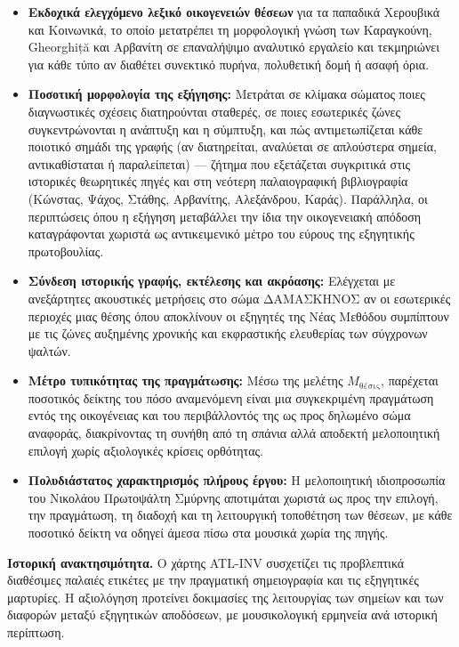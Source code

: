 \documentclass[11pt,a4paper]{article}
\begin{document}
\begin{itemize}
\item
  \textbf{Εκδοχικά ελεγχόμενο λεξικό οικογενειών θέσεων} για τα παπαδικά Χερουβικά και Κοινωνικά, το οποίο μετατρέπει τη μορφολογική γνώση των Καραγκούνη, Gheorghiță και Αρβανίτη σε επαναλήψιμο αναλυτικό εργαλείο και τεκμηριώνει για κάθε τύπο αν διαθέτει συνεκτικό πυρήνα, πολυθετική δομή ή ασαφή όρια.
\item
  \textbf{Ποσοτική μορφολογία της εξήγησης:} Μετράται σε κλίμακα σώματος ποιες διαγνωστικές σχέσεις διατηρούνται σταθερές, σε ποιες εσωτερικές ζώνες συγκεντρώνονται η ανάπτυξη και η σύμπτυξη, και πώς αντιμετωπίζεται κάθε ποιοτικό σημάδι της γραφής (αν διατηρείται, αναλύεται σε απλούστερα σημεία, αντικαθίσταται ή παραλείπεται) --- ζήτημα που εξετάζεται συγκριτικά στις ιστορικές θεωρητικές πηγές και στη νεότερη παλαιογραφική βιβλιογραφία (Κώνστας, Ψάχος, Στάθης, Αρβανίτης, Αλεξάνδρου, Καράς). Παράλληλα, οι περιπτώσεις όπου η εξήγηση μεταβάλλει την ίδια την οικογενειακή απόδοση καταγράφονται χωριστά ως αντικειμενικό μέτρο του εύρους της εξηγητικής πρωτοβουλίας.
\item
  \textbf{Σύνδεση ιστορικής γραφής, εκτέλεσης και ακρόασης:} Ελέγχεται με ανεξάρτητες ακουστικές μετρήσεις στο σώμα ΔΑΜΑΣΚΗΝΟΣ αν οι εσωτερικές περιοχές μιας θέσης όπου αποκλίνουν οι εξηγητές της Νέας Μεθόδου συμπίπτουν με τις ζώνες αυξημένης χρονικής και εκφραστικής ελευθερίας των σύγχρονων ψαλτών.
\item
  \textbf{Μέτρο τυπικότητας της πραγμάτωσης:} Μέσω της μελέτης \(M_{\text{θέσις}}\), παρέχεται ποσοτικός δείκτης του πόσο αναμενόμενη είναι μια συγκεκριμένη πραγμάτωση εντός της οικογένειας και του περιβάλλοντός της ως προς δηλωμένο σώμα αναφοράς, διακρίνοντας τη συνήθη από τη σπάνια αλλά αποδεκτή μελοποιητική επιλογή χωρίς αξιολογικές κρίσεις ορθότητας.
\item
  \textbf{Πολυδιάστατος χαρακτηρισμός πλήρους έργου:} Η μελοποιητική ιδιοπροσωπία του Νικολάου Πρωτοψάλτη Σμύρνης αποτιμάται χωριστά ως προς την επιλογή, την πραγμάτωση, τη διαδοχή και τη λειτουργική τοποθέτηση των θέσεων, με κάθε ποσοτικό δείκτη να οδηγεί άμεσα πίσω στα μουσικά χωρία της πηγής.
\end{itemize}

\noindent\textbf{Ιστορική ανακτησιμότητα.} Ο χάρτης ATL-INV συσχετίζει τις προβλεπτικά διαθέσιμες παλαιές ετικέτες με την πραγματική σημειογραφία και τις εξηγητικές μαρτυρίες. Η αξιολόγηση προτείνει δοκιμασίες της λειτουργίας των σημείων και των διαφορών μεταξύ εξηγητικών αποδόσεων, με μουσικολογική ερμηνεία ανά ιστορική περίπτωση.
\end{document}
